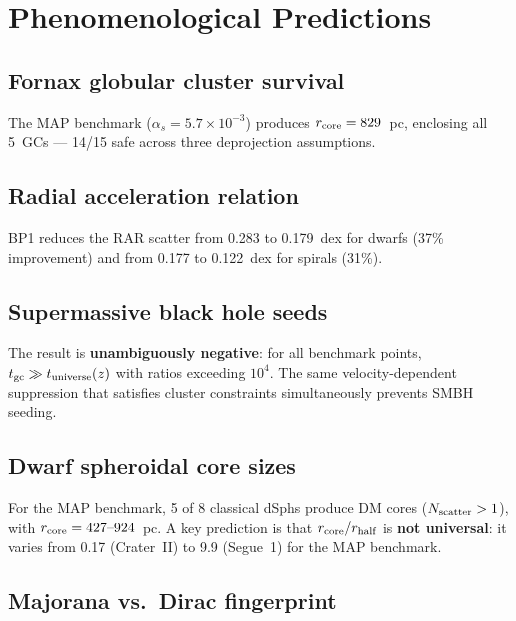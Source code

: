 \documentclass[aps,prd,twocolumn,superscriptaddress,nofootinbib]{revtex4-2}
\begin{document}
\section{Phenomenological Predictions}\label{sec:predictions}

\subsection{Fornax globular cluster survival}\label{sec:fornax_gc}

The MAP benchmark ($\alpha_s=5.7\times 10^{-3}$) produces
$r_{\rm core}=829$~pc, enclosing all 5~GCs --- 14/15
safe across three deprojection assumptions.

\subsection{Radial acceleration relation}\label{sec:rar}

BP1 reduces the RAR scatter from 0.283 to 0.179~dex for
dwarfs (37\% improvement) and from 0.177 to 0.122~dex for
spirals (31\%).

\subsection{Supermassive black hole seeds}\label{sec:smbh}

The result is \textbf{unambiguously negative}: for all benchmark
points, $t_{\rm gc}\gg t_{\rm universe}(z)$ with ratios exceeding
$10^{4}$.  The same velocity-dependent suppression that satisfies
cluster constraints simultaneously prevents SMBH seeding.

\subsection{Dwarf spheroidal core sizes}\label{sec:dsph_cores}

For the MAP benchmark, 5 of 8 classical dSphs produce DM
cores ($N_{\rm scatter}>1$), with
$r_{\rm core}=427\text{--}924$~pc. A key prediction is that
$r_{\rm core}/r_{\rm half}$ is \textbf{not universal}: it varies from
0.17 (Crater~II) to 9.9 (Segue~1) for the MAP benchmark.

\subsection{Majorana vs.\ Dirac fingerprint}\label{sec:maj_vs_dir}
\end{document}
